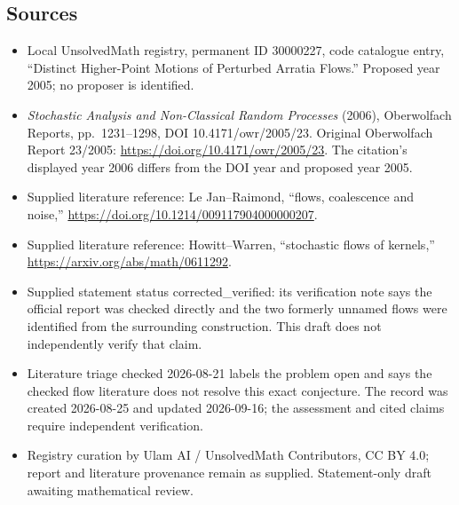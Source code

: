 \documentclass[11pt]{article}
\begin{document}
\subsection{Sources}
\begin{itemize}
\item Local UnsolvedMath registry, permanent ID 30000227, code catalogue entry, ``Distinct Higher-Point Motions of Perturbed Arratia Flows.'' Proposed year 2005; no proposer is identified.
\item \emph{Stochastic Analysis and Non-Classical Random Processes} (2006), Oberwolfach Reports, pp.\ 1231--1298, DOI 10.4171/owr/2005/23. Original Oberwolfach Report 23/2005: \url{https://doi.org/10.4171/owr/2005/23}. The citation's displayed year 2006 differs from the DOI year and proposed year 2005.
\item Supplied literature reference: Le Jan--Raimond, ``flows, coalescence and noise,'' \url{https://doi.org/10.1214/009117904000000207}.
\item Supplied literature reference: Howitt--Warren, ``stochastic flows of kernels,'' \url{https://arxiv.org/abs/math/0611292}.
\item Supplied statement status corrected\_verified: its verification note says the official report was checked directly and the two formerly unnamed flows were identified from the surrounding construction. This draft does not independently verify that claim.
\item Literature triage checked 2026-08-21 labels the problem open and says the checked flow literature does not resolve this exact conjecture. The record was created 2026-08-25 and updated 2026-09-16; the assessment and cited claims require independent verification.
\item Registry curation by Ulam AI / UnsolvedMath Contributors, CC BY 4.0; report and literature provenance remain as supplied. Statement-only draft awaiting mathematical review.
\end{itemize}
\end{document}
